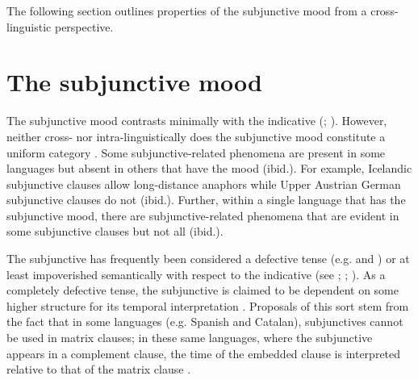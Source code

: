 \documentclass[output=paper,
modfonts,
newtxmath,
hidelinks,
]{langscibook}
\begin{document}
\ea \label{10:ex18}
\z\z

\noindent The following section outlines properties of the subjunctive mood from a cross-linguistic perspective. 

\section{The subjunctive mood}\label{10:s3}

The subjunctive mood contrasts minimally with the indicative (\citealt[660]{Quer2006}; \citealt[218]{Wiltschko}). However, neither cross- nor intra-linguistically does the subjunctive mood constitute a uniform category \citep[661]{Quer2006}. Some subjunctive-related phenomena are present in some languages but absent in others that have the mood (ibid.). For example, Icelandic subjunctive clauses allow long-distance anaphors while Upper Austrian German subjunctive clauses do not (ibid.). Further, within a single language that has the subjunctive mood, there are subjunctive-related phenomena that are evident in some subjunctive clauses but not all (ibid.).

The subjunctive has frequently been considered a defective tense (e.g. \citealt{Picallo1984} and \citealt{Giannakidou2009}) or at least impoverished semantically with respect to the indicative (see \citealt{Cowper2002}; \citealt{Cowper2005}; \citealt{Schlenker2005}). As a completely defective tense, the subjunctive is claimed to be dependent on some higher structure for its temporal interpretation \citep[2]{Wiltschko}. Proposals of this sort stem from the fact that in some languages (e.g. Spanish and Catalan), subjunctives cannot be used in matrix clauses; in these same languages, where the subjunctive appears in a complement clause, the time of the embedded clause is interpreted relative to that of the matrix clause \citep{Wiltschko}.\largerpage[-1]
\end{document}
